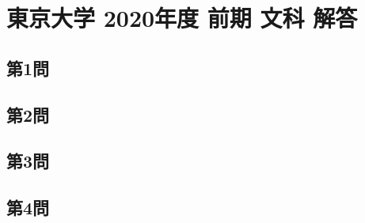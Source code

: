 ﻿\documentclass[../../uem_tok_a.tex]{subfiles}
\begin{document}
    \section{東京大学 2020年度 前期 文科 解答}

    \subsection{第1問}
    

    \clearpage
    \subsection{第2問}
    

    \clearpage
    \subsection{第3問}
    

    \clearpage
    \subsection{第4問}
    

    \clearpage
\end{document}
